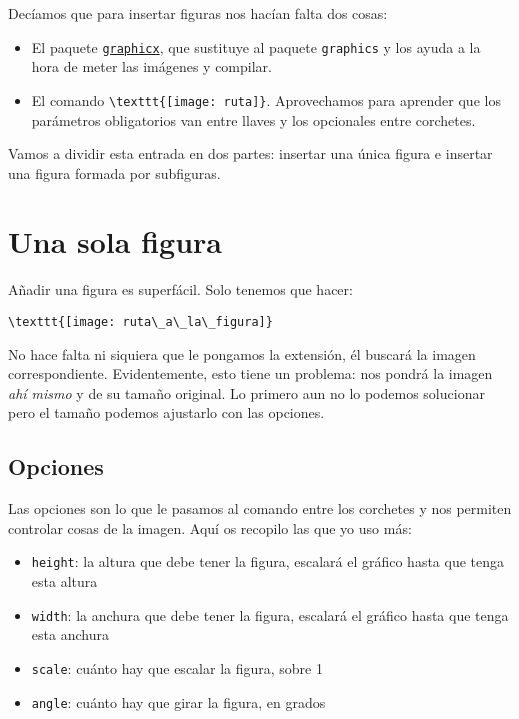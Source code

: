 Decíamos que para insertar figuras nos hacían falta dos cosas:

\begin{itemize}
\item
  El paquete
  \href{https://ctan.org/pkg/graphicx}{\lstinline!graphicx!}, que sustituye al paquete 
  \lstinline!graphics! y los ayuda a la hora de meter las imágenes y compilar.
\item
  El comando \lstinline!\texttt{[image: ruta]}!. Aprovechamos
  para aprender que los parámetros obligatorios van entre llaves y los
  opcionales entre corchetes.
\end{itemize}

Vamos a dividir esta entrada en dos partes: insertar una única figura e
insertar una figura formada por subfiguras.

\section{Una sola figura}\label{sec:unaFigura}

Añadir una figura es superfácil. Solo tenemos que hacer:

\begin{lstlisting}[language={[latex]tex}]
\texttt{[image: ruta\_a\_la\_figura]} 
\end{lstlisting}

No hace falta ni siquiera que le pongamos la extensión, él buscará la
imagen correspondiente. Evidentemente, esto tiene un problema: nos
pondrá la imagen \emph{ahí mismo} y de su tamaño original. Lo primero
aun no lo podemos solucionar pero el tamaño podemos ajustarlo con las
opciones.

\subsection{Opciones}\label{opciones}

Las opciones son lo que le pasamos al comando entre los corchetes y nos
permiten controlar cosas de la imagen. Aquí os recopilo las que yo uso
más:

\begin{itemize}
\item
  \lstinline!height!: la altura que debe tener la figura, escalará el
  gráfico hasta que tenga esta altura
\item
  \lstinline!width!: la anchura que debe tener la figura, escalará el
  gráfico hasta que tenga esta anchura
\item
  \lstinline!scale!: cuánto hay que escalar la figura, sobre 1
\item
  \lstinline!angle!: cuánto hay que girar la figura, en grados
\end{itemize}


